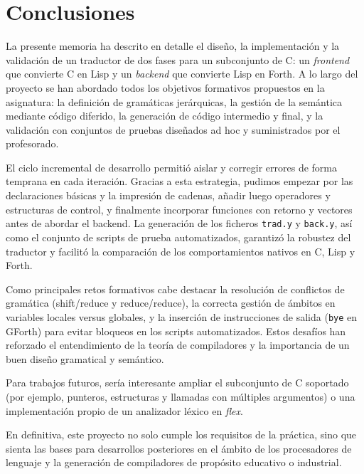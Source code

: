\documentclass[12pt,a4paper]{article}
\begin{document}
\section{Conclusiones}

\noindent La presente memoria ha descrito en detalle el diseño, la implementación y la validación de un traductor 
de dos fases para un subconjunto de C: un \emph{frontend} que convierte C en Lisp y un \emph{backend} que 
convierte Lisp en Forth. A lo largo del proyecto se han abordado todos los objetivos formativos propuestos 
en la asignatura: la definición de gramáticas jerárquicas, la gestión de la semántica mediante código 
diferido, la generación de código intermedio y final, y la validación con conjuntos de pruebas 
diseñados ad hoc y suministrados por el profesorado.

\noindent El ciclo incremental de desarrollo permitió aislar y corregir errores de forma temprana en cada iteración. 
Gracias a esta estrategia, pudimos empezar por las declaraciones básicas y la impresión de cadenas, añadir luego 
operadores y estructuras de control, y finalmente incorporar funciones con retorno y vectores antes de abordar el 
backend. La generación de los ficheros \texttt{trad.y} y \texttt{back.y}, así como el conjunto de scripts de prueba 
automatizados, garantizó la robustez del traductor y facilitó la comparación de los comportamientos nativos en C, 
Lisp y Forth.

\noindent Como principales retos formativos cabe destacar la resolución de conflictos de gramática (shift/reduce y 
reduce/reduce), la correcta gestión de ámbitos en variables locales versus globales, y la inserción de instrucciones 
de salida (\texttt{bye} en GForth) para evitar bloqueos en los scripts automatizados. Estos desafíos han reforzado 
el entendimiento de la teoría de compiladores y la importancia de un buen diseño gramatical y semántico.

\noindent Para trabajos futuros, sería interesante ampliar el subconjunto de C soportado (por ejemplo, 
punteros, estructuras y llamadas con múltiples argumentos) o una implementación propio de un analizador 
léxico en \emph{flex}.

\noindent En definitiva, este proyecto no solo cumple los requisitos de la práctica, sino que sienta las bases para 
desarrollos posteriores en el ámbito de los procesadores de lenguaje y la generación de compiladores de 
propósito educativo o industrial.
\end{document}
